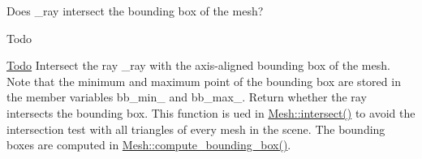 Does {\ttfamily \+\_\+ray} intersect the bounding box of the mesh? 

\begin{DoxyRefDesc}{Todo}
\item[\hyperlink{todo__todo000002}{Todo}]Intersect the ray {\ttfamily \+\_\+ray} with the axis-\/aligned bounding box of the mesh. Note that the minimum and maximum point of the bounding box are stored in the member variables {\ttfamily bb\+\_\+min\+\_\+} and {\ttfamily bb\+\_\+max\+\_\+}. Return whether the ray intersects the bounding box. This function is ued in {\ttfamily \hyperlink{classMesh_a3d982c37d43eb5d3929b2de2b263d662}{Mesh\+::intersect()}} to avoid the intersection test with all triangles of every mesh in the scene. The bounding boxes are computed in {\ttfamily \hyperlink{classMesh_a303c102fd254ea32b366591aa00f6e8e}{Mesh\+::compute\+\_\+bounding\+\_\+box()}}. \end{DoxyRefDesc}
